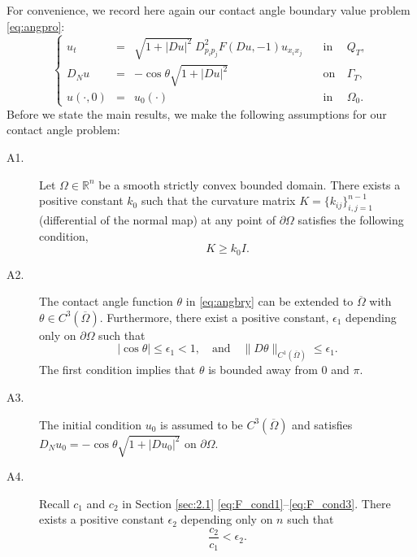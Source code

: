 \documentclass[12pt]{article}
\numberwithin{equation}{section}
\theoremstyle{plain}
\theoremstyle{definition}
\theoremstyle{remark}
\begin{document}
For convenience, we record here again our contact angle boundary value problem
\eqref{eq:angpro}: 
\begin{equation} \label{eq:angbry}
    \left\{ \begin{array}{cllcl}
            u_t & = & \sqrt{1+|Du|^2} \  D^2_{p_i p_j} F (Du,-1) u_{x_i x_j}   \quad &  \text{in} & \ {Q}_T , \\
            D_N u & = & -  \cos \theta \sqrt{1+|Du|^2}  \quad &  \text{on} & \ \Gamma_T ,  \\
         u(\cdot,0) & = & u_0(\cdot)  \quad \ & \text{in} & \ \Omega_0 .
    \end{array}  \right.
\end{equation}
Before we state the main results, we make the following assumptions for our
contact angle problem:
\begin{description}
\item[A1.] 
Let $\Omega\in \mathbb{R}^n$ be a smooth strictly convex bounded domain. There exists a positive constant $k_0$ such that the curvature matrix $K = \{ k_{ij} \}_{i,j=1}^{n-1}$ (differential of the normal map) at any point of $\partial\Omega$ satisfies the following condition,
\begin{equation*}
    K \geq k_0 I.
\end{equation*}
\item[A2.]
The contact angle function $\theta$ in \eqref{eq:angbry} can be extended to $\overline{\Omega}$ with $\theta \in C^3 (\overline{\Omega})$. Furthermore, there exist a positive constant, $\epsilon_1$ depending only on $\partial\Omega$ such that 
\begin{equation} \label{eq:ang_condA2}
    |\cos{\theta}|\leq \epsilon_1 <1, \quad \text{and} \quad \| D\theta\|_{C^1(\overline{\Omega})} \leq \epsilon_1.
\end{equation}
The first condition implies that $\theta$ is bounded away from $0$ and $\pi$.

\item[A3.] The initial condition $u_0$ is assumed to be $C^3(\overline{\Omega})$ and satisfies $D_N u_0 = - \cos \theta \sqrt{1+|Du_0|^2} $ on $\partial \Omega$.

\item[A4.] Recall $c_1$ and $c_2$ in Section \ref{sec:2.1} \eqref{eq:F_cond1}--\eqref{eq:F_cond3}. There exists a positive constant $\epsilon_2$ depending only on $n$ such that
\begin{equation} \label{eq:ang_condA4}
    \frac{c_2}{c_1} < \epsilon_2.
\end{equation}
\end{description}
\end{document}
